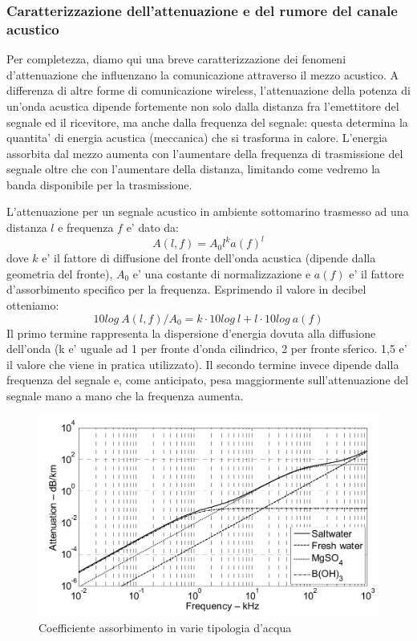 \subsubsection{Caratterizzazione dell'attenuazione e del rumore del canale acustico}
\par
Per completezza, diamo qui una breve caratterizzazione dei fenomeni d'attenuazione che influenzano la comunicazione attraverso il mezzo acustico. A differenza di altre forme di comunicazione wireless, l'attenuazione della potenza di un'onda acustica dipende fortemente non solo dalla distanza fra l'emettitore del segnale ed il ricevitore, ma anche dalla frequenza del segnale: questa determina la quantita' di energia acustica (meccanica) che si trasforma in calore. L'energia assorbita dal mezzo aumenta con l'aumentare della frequenza di trasmissione del segnale oltre che con l'aumentare della distanza, limitando come vedremo la banda disponibile per la trasmissione.
\par
L'attenuazione per un segnale acustico in ambiente sottomarino trasmesso ad una distanza $l$ e frequenza $f$ e' dato da:
\[A(l, f) = A_0 l^k a(f)^l\]
dove $k$ e' il fattore di diffusione del fronte dell'onda acustica (dipende dalla geometria del fronte), $A_0$ e' una costante di normalizzazione e $a(f)$ e' il fattore d'assorbimento specifico per la frequenza.
Esprimendo il valore in decibel otteniamo:
\[10log\ A(l, f)/A_0 = k \cdot 10log\ l + l \cdot 10log\ a(f)\]
Il primo termine rappresenta la dispersione d'energia dovuta alla diffusione dell'onda (k e' uguale ad 1 per fronte d'onda cilindrico, 2 per fronte sferico. 1,5 e' il valore che viene in pratica utilizzato). Il secondo termine invece dipende dalla frequenza del segnale e, come anticipato, pesa maggiormente sull'attenuazione del segnale mano a mano che la frequenza aumenta.

\begin{figure}[H]
    \centering
    \includegraphics[scale=1.4]{waterabsorption.jpeg}
    \caption{Coefficiente assorbimento in varie tipologia d'acqua}
\end{figure}

